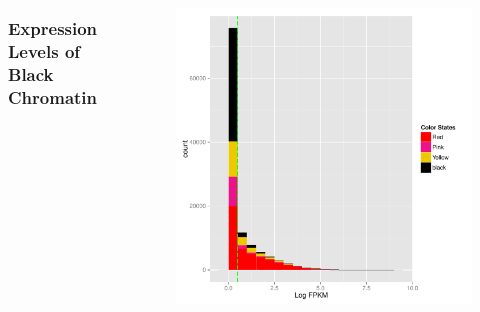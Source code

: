 \documentclass{beamer}
\begin{document}
\begin{frame}
\begin{columns}
\begin{column}{.5\textwidth}
		\end{column}
	\end{columns}
\end{frame}

\begin{frame}
\begin{columns}
\frametitle{Expression Levels of Black Chromatin}
		\pause
 		\begin{column}{.5\textwidth}
		\begin{figure}
   			\includegraphics[width=1.\textwidth]{figs/TSSFPKM}
  		\end{figure}
		\end{column}
	

\end{columns}
\end{frame}
\end{document}
